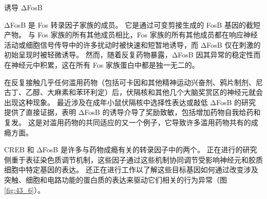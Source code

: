 诱导 ΔFosB

ΔFosB 是 Fos 转录因子家族的成员。 它是通过可变剪接生成的 FosB 基因的截短产物。 与 Fos 家族的所有其他成员相比，Fos 家族的所有其他成员都在响应神经活动或细胞信号传导中的许多扰动时被快速和短暂地诱导，而 ΔFosB 仅在刺激的初始呈现时被轻微诱导。 然而，随着反复药物暴露，ΔFosB 因其异常的稳定性而在神经元中积累，这在所有 Fos 家族蛋白中都是独一无二的。

在反复接触几乎任何滥用药物（包括可卡因和其他精神运动兴奋剂、鸦片制剂、尼古丁、乙醇、大麻素和苯环利定）后，伏隔核和其他几个大脑奖赏区的神经元就会出现这种现象。 最近涉及在成年小鼠伏隔核中选择性表达或敲低 ΔFosB 的研究提供了直接证据，表明 ΔFosB 的诱导介导了奖励致敏，包括增加药物自我给药和复发。 这是对滥用药物的共同适应的又一个例子，它导致许多滥用药物共有的成瘾方面。

CREB 和 ΔFosB 是许多与药物成瘾有关的转录因子中的两个。 正在进行的研究侧重于表征染色质调节机制，这些因子通过这些机制协同调节受影响神经元和胶质细胞中特定基因的表达。 
还正在进行工作以了解这些目标基因如何通过改变涉及突触、细胞和电路功能的蛋白质的表达来驱动它们相关的行为异常（图 \ref{fig:43_6}）。

